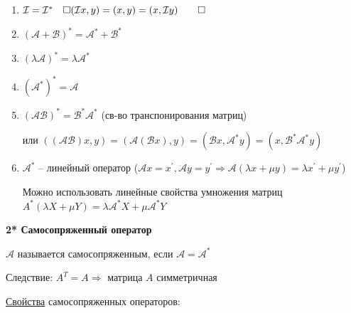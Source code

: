 \documentclass[12pt]{article}
\begin{document}
    \begin{enumerate}

        \item $\mathcal{I} = \mathcal{I}^* \quad \Box (\mathcal{I}x, y) = (x, y) = (x, \mathcal{I}y) \qed$

        \item $(\mathcal{A} + \mathcal{B})^* = \mathcal{A}^* + \mathcal{B}^*$

        \item $(\lambda \mathcal{A})^* = \lambda \mathcal{A}^*$

        \item $(\mathcal{A}^*)^* = \mathcal{A}$

        \item $(\mathcal{A}\mathcal{B})^* = \mathcal{B}^* \mathcal{A}^*$ (св-во транспонирования матриц)

        или $((\mathcal{AB})x, y) = (\mathcal{A}(\mathcal{B}x), y) = (\mathcal{B}x, \mathcal{A}^* y) = (x, \mathcal{B}^* \mathcal{A}^* y)$

        \item $\mathcal{A}^*$ -- линейный оператор ($\mathcal{A}x = x^\prime, \mathcal{A}y = y^\prime \Longrightarrow \mathcal{A}(\lambda x + \mu y) = \lambda x^\prime + \mu y^\prime$)

        Можно использовать линейные свойства умножения матриц $A^* (\lambda X + \mu Y) = \lambda \mathcal{A}^* X + \mu \mathcal{A}^* Y$
    \end{enumerate}

    \hypertarget{selfconjugateoperator}{}

    \textbf{2* Самосопряженный оператор}

    \Def $\mathcal{A}$ называется самосопряженным, если $\mathcal{A} = \mathcal{A}^*$

    Следствие: $A^T = A \Longrightarrow$ матрица $A$ симметричная

    \hypertarget{selfconjugateoperatorproperties}{}

    \underline{Свойства} самосопряженных операторов:
\end{document}
